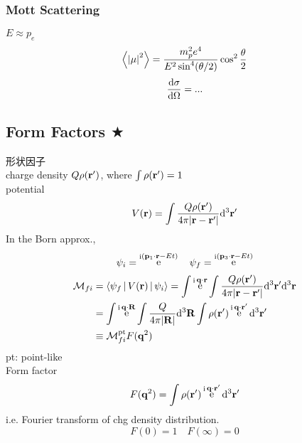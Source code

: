\documentclass[a4paper]{article}
\DeclareMathOperator{\e}{\mathrm{e}}
\DeclareMathOperator{\I}{\mathrm{i}}
\numberwithin{equation}{section}
\begin{document}
\subsubsection{Mott Scattering}
$ E \approx p_e $
\begin{equation}\label{key}
\ev{\abs{\mu}^2} = \dfrac{m_p^2 e^4}{E^2 \sin^4 (\theta/2)}\cos^2\dfrac{\theta}{2}
\end{equation}
\begin{equation}\label{key}
\dv{\sigma}{\Omega} = ...
\end{equation}

\subsection{Form Factors $ \bigstar $}
形状因子\\
charge density $ Q\rho(\vb{r}') $, where $ \int \rho(\vb{r}') = 1 $\\
potential
\begin{equation}\label{key}
V(\vb{r}) = \int \dfrac{Q\rho(\vb{r}')}{4\pi\abs{\vb{r} - \vb{r}'}} \dd[3]\vb{r}'
\end{equation}
In the Born approx., 
\begin{equation}\label{key}
\psi_i = \e^{\I(\vb{p}_1\cdot\vb{r} - Et)} \quad \psi_f = \e^{\I(\vb{p}_3\cdot\vb{r} - Et)}
\end{equation}
\begin{equation}\label{key}
\begin{aligned}
\mathcal{M}_{fi} &= \Braket{\psi_f | V(\vb{r}) | \psi_i} = \int \e^{\I \vb{q}\cdot\vb{r}} \int \dfrac{Q\rho(\vb{r}')}{4\pi\abs{\vb{r} - \vb{r}'}} \dd[3]\vb{r}' \dd[3]\vb{r}\\
&= \int \e^{\I \vb{q}\cdot\vb{R}}
 \int \dfrac{Q}{4\pi\abs{\vb{R}}}  \dd[3]\vb{R}
 \int \rho(\vb{r}')\e^{\I\vb{q}\cdot\vb{r}'}\dd[3]\vb{r}'\\
&\equiv \mathcal{M}_{fi}^{\text{pt}} F(\vb{q}^2)
\end{aligned}
\end{equation}
pt: point-like\\
Form factor
\begin{equation}\label{key}
F(\vb{q}^2) = \int \rho(\vb{r}')\e^{\I\vb{q}\cdot\vb{r}'}\dd[3]\vb{r}'
\end{equation}
i.e. Fourier transform of chg density distribution.
\begin{equation}\label{key}
F(0) = 1 \quad F(\infty) = 0
\end{equation}
\end{document}
